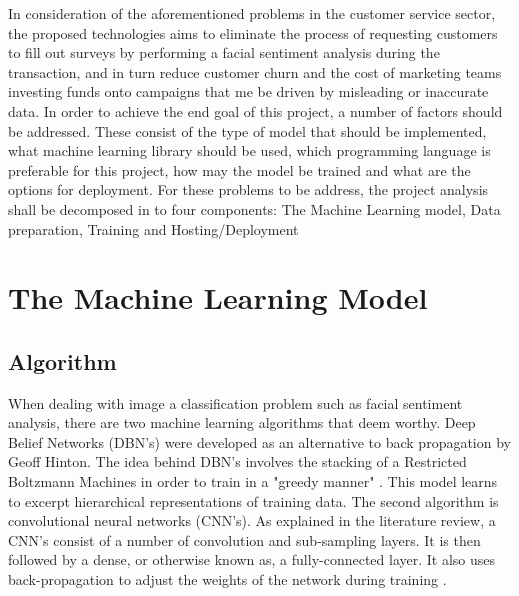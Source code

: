 In consideration of the aforementioned problems in the customer service sector, the proposed technologies aims to eliminate the process of requesting customers to fill out surveys by performing a facial sentiment analysis during the transaction, and in turn reduce customer churn and the cost of marketing teams investing funds onto campaigns that me be driven by misleading or inaccurate data. In order to achieve the end goal of this project, a number of factors should be addressed. These consist of the type of model that should be implemented, what machine learning library should be used, which programming language is preferable for this project, how may the model be trained and what are the options for deployment. For these problems to be address, the project analysis shall be decomposed in to four components: The Machine Learning model, Data preparation, Training and Hosting/Deployment


 	
 	


\section{The Machine Learning Model}


\subsection{Algorithm}
When dealing with image a classification problem such as facial sentiment analysis, there are two machine learning algorithms that deem worthy. Deep Belief Networks (DBN's) were developed as an alternative to back propagation by Geoff Hinton. The idea behind DBN's involves the stacking of a Restricted Boltzmann Machines in order to train in a "greedy manner" \citep{dbn}. This model learns to excerpt hierarchical representations of training data. The second algorithm is convolutional neural networks (CNN's). As explained in the literature review, a CNN's consist of a number of convolution and sub-sampling layers. It is then followed by a dense, or otherwise known as, a fully-connected layer. It also uses back-propagation to adjust the weights of the network during training \citep{gupta}. 


